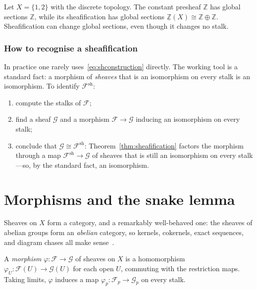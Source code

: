 \begin{corollary}
  \label{cor:twopoints}
  Let $X = \{1, 2\}$ with the discrete topology. The constant presheaf
  $\mathbb{Z}$ has global sections $\mathbb{Z}$, while its
  sheafification has global sections
  $\underline{\mathbb{Z}}(X) \cong \mathbb{Z} \oplus \mathbb{Z}$.
  Sheafification can change global sections, even though it changes no
  stalk.
\end{corollary}

\subsubsection{How to recognise a sheafification}
\label{sec:recognise}

In practice one rarely uses~\eqref{eq:shconstruction} directly. The
working tool is a standard fact: a morphism of \emph{sheaves} that is an
isomorphism on every stalk is an isomorphism. To identify
$\mathcal{F}^{\mathrm{sh}}$:
\begin{enumerate}
  \item compute the stalks of $\mathcal{F}$;
  \item find a sheaf $\mathcal{G}$ and a morphism
        $\mathcal{F} \to \mathcal{G}$ inducing an isomorphism on every
        stalk;
  \item conclude that $\mathcal{G} \cong \mathcal{F}^{\mathrm{sh}}$:
        Theorem~\ref{thm:sheafification} factors the morphism through a
        map $\mathcal{F}^{\mathrm{sh}} \to \mathcal{G}$ of sheaves that
        is still an isomorphism on every stalk---so, by the standard
        fact, an isomorphism.
\end{enumerate}

\section{Morphisms and the snake lemma}
\label{sec:snake}

Sheaves on $X$ form a category, and a remarkably well-behaved one: the
sheaves of abelian groups form an \emph{abelian} category, so kernels,
cokernels, exact sequences, and diagram chases all make
sense~\autocite[\S 2.6]{vakil2017}.

\begin{definition}
  \label{def:morphism}
  A \emph{morphism} $\varphi \colon \mathcal{F} \to \mathcal{G}$ of
  sheaves on $X$ is a homomorphism
  $\varphi_U \colon \mathcal{F}(U) \to \mathcal{G}(U)$ for each open
  $U$, commuting with the restriction maps. Taking limits, $\varphi$
  induces a map $\varphi_p \colon \mathcal{F}_p \to \mathcal{G}_p$ on
  every stalk.
\end{definition}

